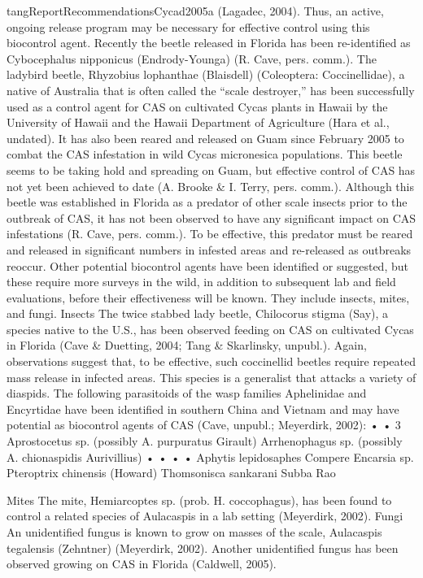 \documentclass[12pt,letterpaper,english,bibliography=totocnumbered, abstract=on]{scrartcl}
\begin{document}
\begin{appendices}
\begin{displaycquote}{tangReportRecommendationsCycad2005a}
(Lagadec, 2004). Thus, an active, ongoing release program may be necessary for effective control using this
biocontrol agent. Recently the beetle released in Florida has been re-identified as Cybocephalus nipponicus
(Endrody-Younga) (R. Cave, pers. comm.).
The ladybird beetle, Rhyzobius lophanthae (Blaisdell) (Coleoptera: Coccinellidae), a native of Australia
that is often called the “scale destroyer,” has been successfully used as a control agent for CAS on
cultivated Cycas plants in Hawaii by the University of Hawaii and the Hawaii Department of Agriculture
(Hara et al., undated). It has also been reared and released on Guam since February 2005 to combat the
CAS infestation in wild Cycas micronesica populations. This beetle seems to be taking hold and
spreading on Guam, but effective control of CAS has not yet been achieved to date (A. Brooke \& I. Terry,
pers. comm.). Although this beetle was established in Florida as a predator of other scale insects prior to
the outbreak of CAS, it has not been observed to have any significant impact on CAS infestations (R.
Cave, pers. comm.). To be effective, this predator must be reared and released in significant numbers in
infested areas and re-released as outbreaks reoccur.
Other potential biocontrol agents have been identified or suggested, but these require more surveys in the
wild, in addition to subsequent lab and field evaluations, before their effectiveness will be known. They
include insects, mites, and fungi.
Insects
The twice stabbed lady beetle, Chilocorus stigma (Say), a species native to the U.S., has been observed
feeding on CAS on cultivated Cycas in Florida (Cave \& Duetting, 2004; Tang \& Skarlinsky, unpubl.).
Again, observations suggest that, to be effective, such coccinellid beetles require repeated mass release in
infected areas. This species is a generalist that attacks a variety of diaspids.
The following parasitoids of the wasp families Aphelinidae and Encyrtidae have been identified in
southern China and Vietnam and may have potential as biocontrol agents of CAS (Cave, unpubl.;
Meyerdirk, 2002):
•
•
3
Aprostocetus sp. (possibly A. purpuratus
Girault)
Arrhenophagus sp. (possibly A. chionaspidis
Aurivillius)
•
•
•
•
Aphytis lepidosaphes Compere
Encarsia sp.
Pteroptrix chinensis (Howard)
Thomsonisca sankarani Subba Rao

Mites
The mite, Hemiarcoptes sp. (prob. H. coccophagus), has been found to control a related species of
Aulacaspis in a lab setting (Meyerdirk, 2002).
Fungi
An unidentified fungus is known to grow on masses of the scale, Aulacaspis tegalensis (Zehntner)
(Meyerdirk, 2002). Another unidentified fungus has been observed growing on CAS in Florida (Caldwell,
2005).
\end{displaycquote}


\end{appendices}
\end{document}
